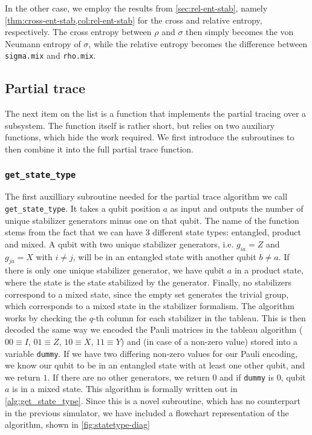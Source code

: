 In the other case, we employ the results from \cref{sec:rel-ent-stab}, namely
\cref{thm:cross-ent-stab,col:rel-ent-stab} for the cross and relative entropy,
respectively.  The cross entropy between $\rho$ and $\sigma$ then simply
becomes the von Neumann entropy of $\sigma$, while the relative entropy becomes
the difference between \verb|sigma.mix| and \verb|rho.mix|.

\subsection{Partial trace}
The next item on the list is a function that implements the partial tracing
over a subsystem. The function itself is rather short, but relies on two
auxiliary functions, which hide the work required. We first introduce the
subroutines to then combine it into the full partial trace function.

\subsubsection{\texttt{get\_state\_type}}
The first auxilliary subroutine needed for
the partial trace algorithm we call \texttt{get\_state\_type}. It
takes a qubit position $a$ as input and outputs the number of unique stabilizer
generators minus one on that qubit. The name of the function stems from the
fact that we can have $3$ different state types: entangled, product and mixed.
A qubit with two unique stabilizer generators, i.e. $g_{ia} = Z$ and $g_{ja} =
X$ with $i\neq j$, will be in an entangled state with another qubit $b\neq a$.
If there is only one unique stabilizer generator, we have qubit $a$ in a
product state, where the state is the state stabilized by the generator.
Finally, no stabilizers correspond to a mixed state, since the empty set
generates the trivial group, which corresponds to a mixed state in the
stabilizer formalism. The algorithm works by checking the $q$-th column for
each stabilizer in the tableau. This is then decoded the same way we encoded
the Pauli matrices in the tableau algorithm ($00 \equiv I$, $01\equiv Z$, $10
\equiv X$, $11 \equiv Y$) and (in case of a non-zero value) stored into a
variable \texttt{dummy}. If we have two differing non-zero values for our Pauli
encoding, we know our qubit to be in an entangled state with at least one other
qubit, and we return $1$. If there are no other generators, we return $0$ and
if \texttt{dummy} is $0$, qubit $a$ is in a mixed state. This algorithm is
formally written out in \cref{alg:get_state_type}. Since this is a novel
subroutine, which has no counterpart in the previous simulator, we have
included a flowchart representation of the algorithm, shown in
\cref{fig:statetype-diag}
%

